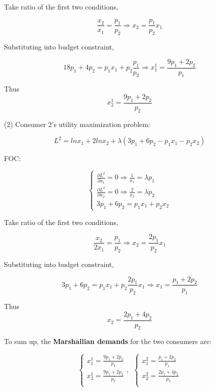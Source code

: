 \documentclass{article}
\begin{document}
Take ratio of the first two conditions,

$$\frac{x_2}{x_1} = \frac{p_1}{p_2} \Rightarrow x_2 = \frac{p_1}{p_2}  x_1$$

Substituting into budget constraint,

$$18p_1 +4p_2 = p_1x_1 + p_2\frac{p_1}{p_2}   \Rightarrow x^1_1 =\frac{9p_1+2p_2}{p_1}$$

Thus $$x^1_2 = \frac{9p_1+2p_2}{p_2}$$ 

(2) Consumer 2's utility maximization problem:

\vspace{3mm}

$$L^2 = ln x_1 + 2ln x_2 + \lambda (3p_1 +6p_2 - p_1x_1 -p_2x_2) $$

FOC:

\begin{equation}
    \begin{cases}
\frac{\partial L^2}{\partial x_1} = 0  \Rightarrow \frac{1}{x_1} = \lambda p_1 \\
\frac{\partial L^2}{\partial x_2} = 0  \Rightarrow \frac{2}{x_2} = \lambda p_2 \\
3p_1 +6p_2 = p_1x_1 + p_2x_2
    \end{cases}
    \nonumber
\end{equation}

Take ratio of the first two conditions,

$$\frac{x_2}{2x_1} = \frac{p_1}{p_2} \Rightarrow x_2 = \frac{2p_1}{p_2}  x_1$$

Substituting into budget constraint,

$$3p_1 +6p_2 = p_1x_1 + p_2\frac{2p_1}{p_2}  x_1   \Rightarrow x_1 =\frac{p_1+2p_2}{p_1}$$

Thus $$x_2 = \frac{2p_1+4p_2}{p_2}$$ 

To sum up, the \textbf{Marshallian demands} for the two consumers are:


\begin{equation}
    \begin{cases}
x^1_1 = \frac{9p_1+2p_2}{p_1} \\
x^1_2 = \frac{9p_1+2p_2}{p_2}  \\
    \end{cases}
, \ \
    \begin{cases}
x^2_1 = \frac{p_1+2p_2}{p_1} \\
x^2_2 = \frac{2p_1+4p_2}{p_2}  \\
    \end{cases}
\label{eq:demand}
\end{equation}
\end{document}
